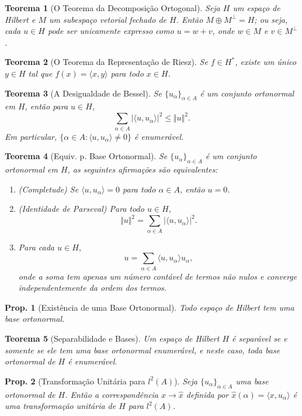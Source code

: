 \documentclass[11pt]{article}
\theoremstyle{yellowhead}
\newtheorem*{theorem}{Teorema}
\newtheorem*{proposition}{Prop.}
\theoremstyle{yellowdef}
\begin{document}
\begin{multicols}{3}
\begin{theorem}[O Teorema da Decomposição Ortogonal]
Seja $H$ um espaço de Hilbert e $M$ um subespaço vetorial fechado de $H$. Então $M \oplus M^\perp = H$; ou seja, cada $u \in H$ pode ser unicamente expresso como $u = w + v$, onde $w \in M$ e $v \in M^\perp$.
\end{theorem}

\begin{theorem}[O Teorema da Representação de Riesz]
Se $f \in H^*$, existe um único $y \in H$ tal que $f(x) = \langle x, y \rangle$ para todo $x \in H$.
\end{theorem}

\begin{theorem}[A Desigualdade de Bessel]
Se $\{u_\alpha\}_{\alpha \in A}$ é um conjunto ortonormal em $H$, então para $u \in H$,
\[
\sum_{\alpha \in A} |\langle u, u_\alpha \rangle|^2 \le \Vert u \Vert^2.
\]
Em particular, $\{\alpha \in A : \langle u, u_\alpha \rangle \neq 0\}$ é enumerável.
\end{theorem}

\begin{theorem}[Equiv. p. Base Ortonormal]
Se $\{u_\alpha\}_{\alpha \in A}$ é um conjunto ortonormal em $H$, as seguintes afirmações são equivalentes:
\begin{enumerate}[label=(\alph*)]
    \item (Completude) Se $\langle u, u_\alpha \rangle = 0$ para todo $\alpha \in A$, então $u = 0$.
    \item (Identidade de Parseval) Para todo $u \in H$,
    \[
    \Vert u \Vert^2 = \sum_{\alpha \in A} |\langle u, u_\alpha \rangle|^2.
    \]
    \item Para cada $u \in H$,
    \[
    u = \sum_{\alpha \in A} \langle u, u_\alpha \rangle u_\alpha,
    \]
    onde a soma tem apenas um número contável de termos não nulos e converge independentemente da ordem dos termos.
\end{enumerate}
\end{theorem}

\begin{proposition}[Existência de uma Base Ortonormal]
Todo espaço de Hilbert tem uma base ortonormal.
\end{proposition}

\begin{theorem}[Separabilidade e Bases]
Um espaço de Hilbert $H$ é separável se e somente se ele tem uma base ortonormal enumerável, e neste caso, toda base ortonormal de $H$ é enumerável.
\end{theorem}

\begin{proposition}[Transformação Unitária para $l^2(A)$]
Seja $\{u_\alpha\}_{\alpha \in A}$ uma base ortonormal de $H$. Então a correspondência $x \to \hat{x}$ definida por $\hat{x}(\alpha) = \langle x, u_\alpha \rangle$ é uma transformação unitária de $H$ para $l^2(A)$.
\end{proposition}
\end{multicols}
\end{document}

